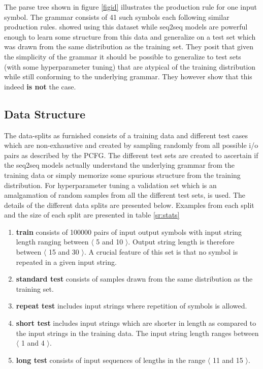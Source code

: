 The parse tree shown in figure \ref{figid} illustrates the production rule for one input symbol. The grammar consists of 41 such symbols each following similar production rules. \cite{Weber2018} showed using this dataset while seq2seq models are powerful enough to learn some structure from this data and generalize on a test set which was drawn from the same distribution as the training set. They posit that given the simplicity of the grammar it should be possible to generalize to test sets (with some hyperparameter tuning) that are atypical of the training distribution while still conforming to the underlying grammar. They however show that this indeed \textbf{is not} the case.

\subsection{Data Structure}
The data-splits as furnished \citep{Weber2018} consists of a training data and different test cases which are non-exhaustive and created by sampling randomly from all possible i/o pairs as described by the PCFG. The different test sets are created to ascertain if the seq2seq models actually understand the underlying grammar from the training data or simply memorize some spurious structure from the training distribution. For hyperparameter tuning a validation set which is an amalgamation of random samples from all the different test sets, is used. The details of the different data splits are presented below. Examples from each split and the size of each split are presented in table \ref{sr:stats}
\begin{enumerate}
	\item \textbf{train} consists of 100000 pairs of input output symbols with input string length ranging between $\langle$ 5 and 10 $\rangle$. Output string length is therefore between $\langle$ 15 and 30 $\rangle$. A crucial feature of this set is that no symbol is repeated in a given input string.
	\item \textbf{standard test} consists of samples drawn from the same distribution as the training set.
	\item \textbf{repeat test} includes input strings where repetition of symbols is allowed.
	\item \textbf{short test} includes input strings which are shorter in length as compared to the input strings in the training data. The input string length ranges between $\langle$ 1 and 4 $\rangle$.
	\item \textbf{long test} consists of input sequences of lengths in the range $\langle$ 11 and 15 $\rangle$.
\end{enumerate}

